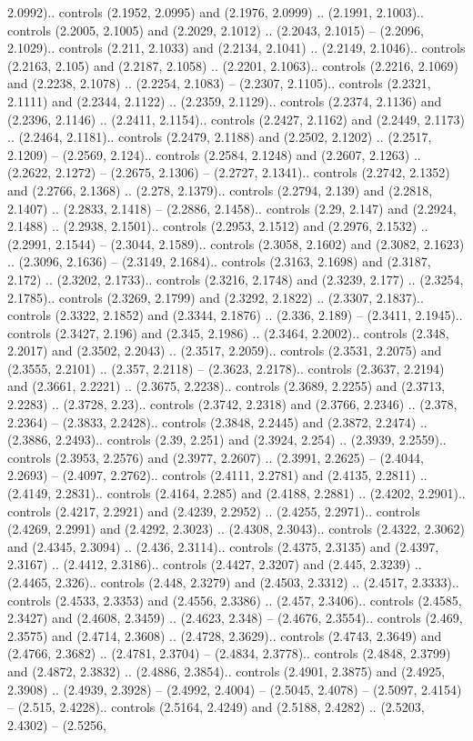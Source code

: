 2.0992).. controls (2.1952, 2.0995) and (2.1976, 2.0999) .. (2.1991, 2.1003).. controls (2.2005, 2.1005) and (2.2029, 2.1012) .. (2.2043, 2.1015) -- (2.2096, 2.1029).. controls (2.211, 2.1033) and (2.2134, 2.1041) .. (2.2149, 2.1046).. controls (2.2163, 2.105) and (2.2187, 2.1058) .. (2.2201, 2.1063).. controls (2.2216, 2.1069) and (2.2238, 2.1078) .. (2.2254, 2.1083) -- (2.2307, 2.1105).. controls (2.2321, 2.1111) and (2.2344, 2.1122) .. (2.2359, 2.1129).. controls (2.2374, 2.1136) and (2.2396, 2.1146) .. (2.2411, 2.1154).. controls (2.2427, 2.1162) and (2.2449, 2.1173) .. (2.2464, 2.1181).. controls (2.2479, 2.1188) and (2.2502, 2.1202) .. (2.2517, 2.1209) -- (2.2569, 2.124).. controls (2.2584, 2.1248) and (2.2607, 2.1263) .. (2.2622, 2.1272) -- (2.2675, 2.1306) -- (2.2727, 2.1341).. controls (2.2742, 2.1352) and (2.2766, 2.1368) .. (2.278, 2.1379).. controls (2.2794, 2.139) and (2.2818, 2.1407) .. (2.2833, 2.1418) -- (2.2886, 2.1458).. controls (2.29, 2.147) and (2.2924, 2.1488) .. (2.2938, 2.1501).. controls (2.2953, 2.1512) and (2.2976, 2.1532) .. (2.2991, 2.1544) -- (2.3044, 2.1589).. controls (2.3058, 2.1602) and (2.3082, 2.1623) .. (2.3096, 2.1636) -- (2.3149, 2.1684).. controls (2.3163, 2.1698) and (2.3187, 2.172) .. (2.3202, 2.1733).. controls (2.3216, 2.1748) and (2.3239, 2.177) .. (2.3254, 2.1785).. controls (2.3269, 2.1799) and (2.3292, 2.1822) .. (2.3307, 2.1837).. controls (2.3322, 2.1852) and (2.3344, 2.1876) .. (2.336, 2.189) -- (2.3411, 2.1945).. controls (2.3427, 2.196) and (2.345, 2.1986) .. (2.3464, 2.2002).. controls (2.348, 2.2017) and (2.3502, 2.2043) .. (2.3517, 2.2059).. controls (2.3531, 2.2075) and (2.3555, 2.2101) .. (2.357, 2.2118) -- (2.3623, 2.2178).. controls (2.3637, 2.2194) and (2.3661, 2.2221) .. (2.3675, 2.2238).. controls (2.3689, 2.2255) and (2.3713, 2.2283) .. (2.3728, 2.23).. controls (2.3742, 2.2318) and (2.3766, 2.2346) .. (2.378, 2.2364) -- (2.3833, 2.2428).. controls (2.3848, 2.2445) and (2.3872, 2.2474) .. (2.3886, 2.2493).. controls (2.39, 2.251) and (2.3924, 2.254) .. (2.3939, 2.2559).. controls (2.3953, 2.2576) and (2.3977, 2.2607) .. (2.3991, 2.2625) -- (2.4044, 2.2693) -- (2.4097, 2.2762).. controls (2.4111, 2.2781) and (2.4135, 2.2811) .. (2.4149, 2.2831).. controls (2.4164, 2.285) and (2.4188, 2.2881) .. (2.4202, 2.2901).. controls (2.4217, 2.2921) and (2.4239, 2.2952) .. (2.4255, 2.2971).. controls (2.4269, 2.2991) and (2.4292, 2.3023) .. (2.4308, 2.3043).. controls (2.4322, 2.3062) and (2.4345, 2.3094) .. (2.436, 2.3114).. controls (2.4375, 2.3135) and (2.4397, 2.3167) .. (2.4412, 2.3186).. controls (2.4427, 2.3207) and (2.445, 2.3239) .. (2.4465, 2.326).. controls (2.448, 2.3279) and (2.4503, 2.3312) .. (2.4517, 2.3333).. controls (2.4533, 2.3353) and (2.4556, 2.3386) .. (2.457, 2.3406).. controls (2.4585, 2.3427) and (2.4608, 2.3459) .. (2.4623, 2.348) -- (2.4676, 2.3554).. controls (2.469, 2.3575) and (2.4714, 2.3608) .. (2.4728, 2.3629).. controls (2.4743, 2.3649) and (2.4766, 2.3682) .. (2.4781, 2.3704) -- (2.4834, 2.3778).. controls (2.4848, 2.3799) and (2.4872, 2.3832) .. (2.4886, 2.3854).. controls (2.4901, 2.3875) and (2.4925, 2.3908) .. (2.4939, 2.3928) -- (2.4992, 2.4004) -- (2.5045, 2.4078) -- (2.5097, 2.4154) -- (2.515, 2.4228).. controls (2.5164, 2.4249) and (2.5188, 2.4282) .. (2.5203, 2.4302) -- (2.5256, 